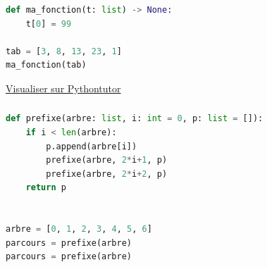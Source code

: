 \documentclass[svgnames,11pt]{beamer}
\begin{document}
\begin{frame}[fragile]
    \frametitle{}


\begin{center}
\begin{lstlisting}[language=Python, basicstyle=\ttfamily\small , xleftmargin=1em, xrightmargin=1em]
def ma_fonction(t: list) -> None:
    t[0] = 99

tab = [3, 8, 13, 23, 1]
ma_fonction(tab)
\end{lstlisting}
\end{center} 
\begin{center}
    {\LARGE \href{https://tinyurl.com/tabfonc}{Visualiser sur Pythontutor}}
\end{center}
\end{frame}
\begin{frame}[fragile]
    \frametitle{}
\begin{center}
\begin{lstlisting}[language=Python, basicstyle=\ttfamily\small , xleftmargin=1em, xrightmargin=0em]
def prefixe(arbre: list, i: int = 0, p: list = []):
    if i < len(arbre):
        p.append(arbre[i])
        prefixe(arbre, 2*i+1, p)
        prefixe(arbre, 2*i+2, p)
    return p


arbre = [0, 1, 2, 3, 4, 5, 6]
parcours = prefixe(arbre)
parcours = prefixe(arbre)
\end{lstlisting}
\label{CODE}
\end{center}


\end{frame}
\end{document}
